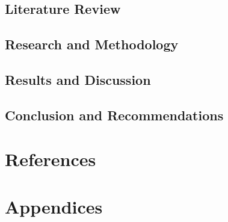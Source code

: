 \documentclass{article}
\begin{document}



\subsection{Literature Review}

\subsection{Research and Methodology}

\subsection{Results and Discussion}

\subsection{Conclusion and Recommendations}

%
\section{References}

\section{Appendices}
\end{document}
